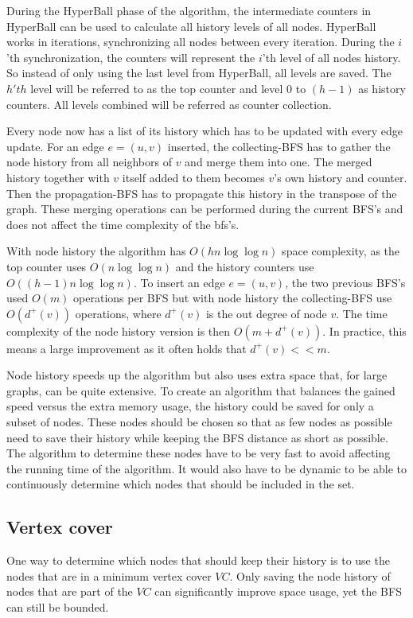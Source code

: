 During the HyperBall phase of the algorithm, the intermediate counters in HyperBall can be used to calculate all history levels of all nodes. HyperBall works in iterations, synchronizing all nodes between every iteration. During the $i$'th synchronization, the counters will represent the $i$'th level of all nodes history. So instead of only using the last level from HyperBall, all levels are saved. The $h'th$ level will be referred to as the top counter and level $0$ to $(h-1)$ as history counters. All levels combined will be referred as counter collection.  

Every node now has a list of its history which has to be updated with every edge update. For an edge $e = (u,v)$ inserted, the collecting-BFS has to gather the node history from all neighbors of $v$ and merge them into one. The merged history together with $v$ itself added to them becomes $v$'s own history and counter. Then the propagation-BFS has to propagate this history in the transpose of the graph. These merging operations can be performed during the current BFS's and does not affect the time complexity of the bfs's.

With node history the algorithm has $O(hn \log \log n)$ space complexity, as the top counter uses $O(n \log \log n)$ and the history counters use $O((h-1)n \log \log n)$. To insert an edge $e = (u,v)$, the two previous BFS's used $O(m)$ operations per BFS but with node history the collecting-BFS use $O(d^+(v))$ operations, where $d^+(v)$ is the out degree of node $v$. The time complexity of the node history version is then $O(m + d^+(v))$. In practice, this means a large improvement as it often holds that $d^+(v) << m$.

Node history speeds up the algorithm but also uses extra space that, for large graphs, can be quite extensive. To create an algorithm that balances the gained speed versus the extra memory usage, the history could be saved for only a subset of nodes. These nodes should be chosen so that as few nodes as possible need to save their history while keeping the BFS distance as short as possible. The algorithm to determine these nodes have to be very fast to avoid affecting the running time of the algorithm. It would also have to be dynamic to be able to continuously determine which nodes that should be included in the set.

\subsection{Vertex cover}
\label{sec:vertex_cover}
One way to determine which nodes that should keep their history is to use the nodes that are in a minimum vertex cover $VC$. Only saving the node history of nodes that are part of the $VC$ can significantly improve space usage, yet the BFS can still be bounded.

